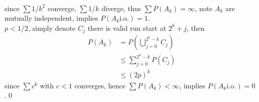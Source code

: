 \documentclass[paper=a4, fontsize=11pt]{scrartcl} %
\numberwithin{equation}{section} %
\numberwithin{figure}{section} %
\numberwithin{table}{section} %
\begin{document}
\begin{itemize}
\begin{align}
	\end{align}
	since $\sum 1/k^2$ converge, $\sum 1/k$ diverge, thus $\sum P(A_k)=\infty$, note $A_k$ are mutually independent, implies $P(A_k\text{i.o.})=1$.\\
	$p<1/2$, simply denote $C_j$ there is valid run start at $2^k+j$, then  
	\begin{align}
		P(A_k) &= P(\bigcup_{j=0}^{2^k-k} C_j) \\
			&\leq \sum_{j=0}^{2^k-k} P(C_j) \\
			&\leq (2p)^k
	\end{align}
	since $\sum c^k$ with $c<1$ converges, hence $\sum P(A_k)<\infty$, implies $P(A_k\text{i.o.})=0$.\qed
\end{itemize}
\end{document}
